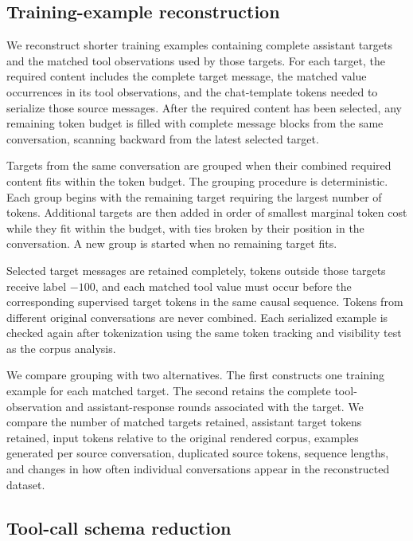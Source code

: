 \documentclass[pdflatex,sn-basic,Numbered]{sn-jnl}
\begin{document}
\subsection{Training-example reconstruction}
\label{sec:materialization}

We reconstruct shorter training examples containing complete assistant targets and the matched
tool observations used by those targets. For each target, the required content includes the
complete target message, the matched value occurrences in its tool observations, and the
chat-template tokens needed to serialize those source messages. After the required content has
been selected, any remaining token budget is filled with complete message blocks from the same
conversation, scanning backward from the latest selected target.

Targets from the same conversation are grouped when their combined required content fits within
the token budget. The grouping procedure is deterministic. Each group begins with the remaining
target requiring the largest number of tokens. Additional targets are then added in order of
smallest marginal token cost while they fit within the budget, with ties broken by their position
in the conversation. A new group is started when no remaining target fits.

Selected target messages are retained completely, tokens outside those targets receive label
$-100$, and each matched tool value must occur before the corresponding supervised target tokens
in the same causal sequence. Tokens from different original conversations are never combined.
Each serialized example is checked again after tokenization using the same token tracking and
visibility test as the corpus analysis.

We compare grouping with two alternatives. The first constructs one training example for each matched target. The second retains the complete tool-observation and assistant-response rounds associated with the target. We compare the number of matched targets retained, assistant target tokens retained, input tokens relative to the original rendered corpus, examples generated per source conversation, duplicated source tokens, sequence lengths, and changes in how often individual conversations appear in the reconstructed dataset.


\subsection{Tool-call schema reduction}
\label{sec:schema_repair}
\end{document}
